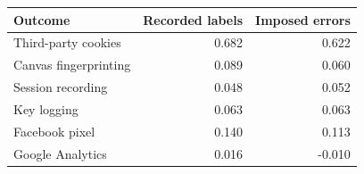 \begin{tabular}{lrr}
\toprule
Outcome & Recorded labels & Imposed errors \\
\midrule
Third-party cookies & 0.682 & 0.622 \\
Canvas fingerprinting & 0.089 & 0.060 \\
Session recording & 0.048 & 0.052 \\
Key logging & 0.063 & 0.063 \\
Facebook pixel & 0.140 & 0.113 \\
Google Analytics & 0.016 & -0.010 \\
\bottomrule
\end{tabular}
